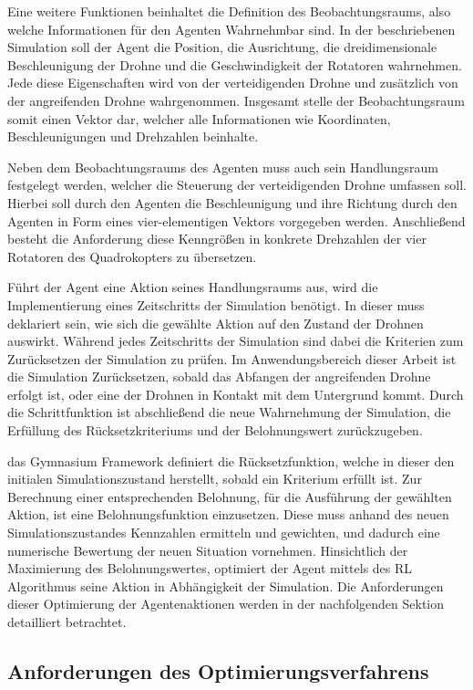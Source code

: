 Eine weitere Funktionen beinhaltet die Definition des Beobachtungsraums, also welche Informationen für den Agenten Wahrnehmbar sind. 
In der beschriebenen Simulation soll der Agent die Position, die Ausrichtung, die dreidimensionale Beschleunigung der Drohne und die Geschwindigkeit der Rotatoren wahrnehmen. 
Jede diese Eigenschaften wird von der verteidigenden Drohne und zusätzlich von der angreifenden Drohne wahrgenommen. 
Insgesamt stelle der Beobachtungsraum somit einen Vektor dar, welcher alle Informationen wie Koordinaten, Beschleunigungen und Drehzahlen beinhalte.

Neben dem Beobachtungsraums des Agenten muss auch sein Handlungsraum festgelegt werden, welcher die Steuerung der verteidigenden Drohne umfassen soll.
Hierbei soll durch den Agenten die Beschleunigung und ihre Richtung durch den Agenten in Form eines vier-elementigen Vektors vorgegeben werden.
Anschließend besteht die Anforderung diese Kenngrößen in konkrete Drehzahlen der vier Rotatoren des Quadrokopters zu übersetzen.

Führt der Agent eine Aktion seines Handlungsraums aus, wird die Implementierung eines Zeitschritts der Simulation benötigt.
In dieser muss deklariert sein, wie sich die gewählte Aktion auf den Zustand der Drohnen auswirkt.
Während jedes Zeitschritts der Simulation sind dabei die Kriterien zum Zurücksetzen der Simulation zu prüfen.
Im Anwendungsbereich dieser Arbeit ist die Simulation Zurücksetzen, sobald das Abfangen der angreifenden Drohne erfolgt ist, oder eine der Drohnen in Kontakt mit dem Untergrund kommt.
Durch die Schrittfunktion ist abschließend die neue Wahrnehmung der Simulation, die Erfüllung des Rücksetzkriteriums und der Belohnungswert zurückzugeben.

das Gymnasium Framework definiert die Rücksetzfunktion, welche in dieser den initialen Simulationszustand herstellt, sobald ein Kriterium erfüllt ist.
Zur Berechnung einer entsprechenden Belohnung, für die Ausführung der gewählten Aktion, ist eine Belohnungsfunktion einzusetzen.
Diese muss anhand des neuen Simulationszustandes Kennzahlen ermitteln und gewichten, und dadurch eine numerische Bewertung der neuen Situation vornehmen.
Hinsichtlich der Maximierung des Belohnungswertes, optimiert der Agent mittels des RL Algorithmus seine Aktion in Abhängigkeit der Simulation. 
Die Anforderungen dieser Optimierung der Agentenaktionen werden in der nachfolgenden Sektion detailliert betrachtet.

\subsection{Anforderungen des Optimierungsverfahrens}

